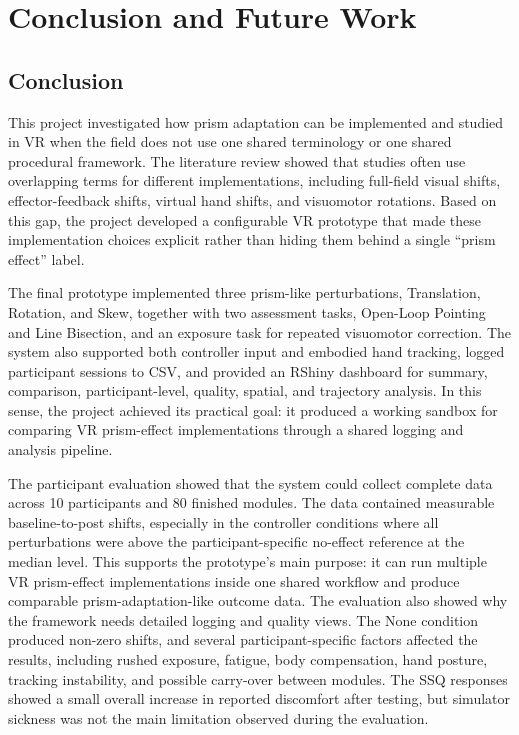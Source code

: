 \chapter{Conclusion and Future Work}
\label{chap:conclusion-future-work}

\section{Conclusion}
\label{sec:conclusion}

This project investigated how prism adaptation can be implemented and studied in VR when the field does not use one shared terminology or one shared procedural framework. The literature review showed that studies often use overlapping terms for different implementations, including full-field visual shifts, effector-feedback shifts, virtual hand shifts, and visuomotor rotations. Based on this gap, the project developed a configurable VR prototype that made these implementation choices explicit rather than hiding them behind a single ``prism effect'' label.

The final prototype implemented three prism-like perturbations, Translation, Rotation, and Skew, together with two assessment tasks, Open-Loop Pointing and Line Bisection, and an exposure task for repeated visuomotor correction. The system also supported both controller input and embodied hand tracking, logged participant sessions to CSV, and provided an RShiny dashboard for summary, comparison, participant-level, quality, spatial, and trajectory analysis. In this sense, the project achieved its practical goal: it produced a working sandbox for comparing VR prism-effect implementations through a shared logging and analysis pipeline.

The participant evaluation showed that the system could collect complete data across 10 participants and 80 finished modules. The data contained measurable baseline-to-post shifts, especially in the controller conditions where all perturbations were above the participant-specific no-effect reference at the median level. This supports the prototype's main purpose: it can run multiple VR prism-effect implementations inside one shared workflow and produce comparable prism-adaptation-like outcome data. The evaluation also showed why the framework needs detailed logging and quality views. The None condition produced non-zero shifts, and several participant-specific factors affected the results, including rushed exposure, fatigue, body compensation, hand posture, tracking instability, and possible carry-over between modules. The SSQ responses showed a small overall increase in reported discomfort after testing, but simulator sickness was not the main limitation observed during the evaluation.

